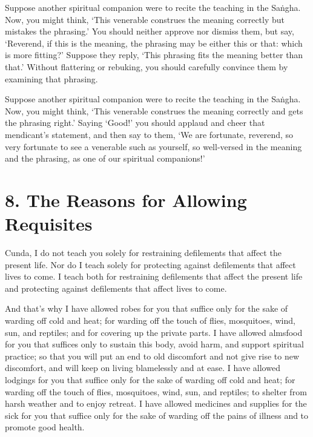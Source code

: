 \documentclass[12pt,openany]{book}%
\begin{document}
Suppose another spiritual companion were to recite the teaching in the \textsanskrit{Saṅgha}. Now, you might think, ‘This venerable construes the meaning correctly but mistakes the phrasing.’ You should neither approve nor dismiss them, but say, ‘Reverend, if this is the meaning, the phrasing may be either this or that: which is more fitting?’ Suppose they reply, ‘This phrasing fits the meaning better than that.’ Without flattering or rebuking, you should carefully convince them by examining that phrasing. 

Suppose another spiritual companion were to recite the teaching in the \textsanskrit{Saṅgha}. Now, you might think, ‘This venerable construes the meaning correctly and gets the phrasing right.’ Saying ‘Good!’ you should applaud and cheer that mendicant’s statement, and then say to them, ‘We are fortunate, reverend, so very fortunate to see a venerable such as yourself, so well-versed in the meaning and the phrasing, as one of our spiritual companions!’ 

\section*{8. The Reasons for Allowing Requisites }

Cunda, I do not teach you solely for restraining defilements that affect the present life. Nor do I teach solely for protecting against defilements that affect lives to come. I teach both for restraining defilements that affect the present life and protecting against defilements that affect lives to come. 

And that’s why I have allowed robes for you that suffice only for the sake of warding off cold and heat; for warding off the touch of flies, mosquitoes, wind, sun, and reptiles; and for covering up the private parts. I have allowed almsfood for you that suffices only to sustain this body, avoid harm, and support spiritual practice; so that you will put an end to old discomfort and not give rise to new discomfort, and will keep on living blamelessly and at ease. I have allowed lodgings for you that suffice only for the sake of warding off cold and heat; for warding off the touch of flies, mosquitoes, wind, sun, and reptiles; to shelter from harsh weather and to enjoy retreat. I have allowed medicines and supplies for the sick for you that suffice only for the sake of warding off the pains of illness and to promote good health. 
\end{document}
